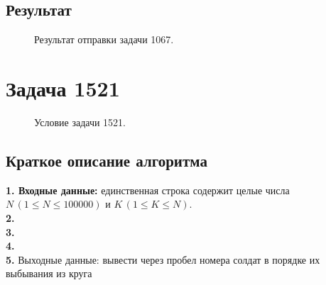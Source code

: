 \documentclass[a5paper, 10pt]{article}
\theoremstyle{definition}
\theoremstyle{plain}
\theoremstyle{remark}
\begin{document}
\subsection{Результат}
\begin{figure}[h!]
\caption{Результат отправки задачи 1067.}
\end{figure}




\newpage
\section{Задача 1521}

\begin{figure}[h!]
\caption{Условие задачи 1521.}
\end{figure}

\subsection{Краткое описание алгоритма}
\textbf{1. Входные данные:} единственная строка содержит целые числа $N\, (1 \leq N \leq 100000)$ и $K \, (1 \leq K \leq N)$. \\
\textbf{2.}  \\
\textbf{3.}  \\
\textbf{4.}  \\
\textbf{5.} Выходные данные: вывести через пробел номера солдат в порядке их выбывания из круга
\end{document}
